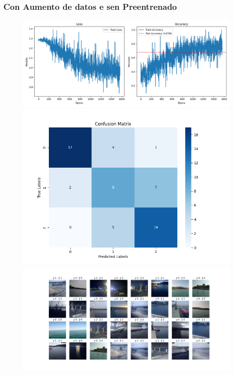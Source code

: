 \documentclass{article}
\begin{document}
\subsubsection{Con Aumento de datos e sen Preentrenado}
\begin{figure}[H]
    \centering
    \begin{minipage}{0.55\textwidth}
        \centering
        \includegraphics[width=\linewidth]{../ultimas_figuras/LOSS__A_True_P_False_D_True_MLP_True_efficientnet_b4.png}
    \end{minipage}
    \begin{minipage}{0.3\textwidth}
        \centering
        \includegraphics[width=\linewidth]{../ultimas_figuras/CM__A_True_P_False_D_True_MLP_True_efficientnet_b4.png}
    \end{minipage}
    \begin{minipage}{0.7\textwidth}
        \centering
        \includegraphics[width=\linewidth]{../ultimas_figuras/GRID__A_True_P_False_D_True_MLP_True_efficientnet_b4.png}
    \end{minipage}
\end{figure}
\end{document}
